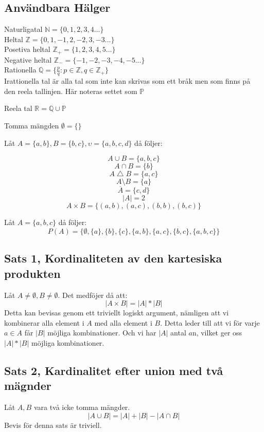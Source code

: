 \documentclass{article}
\begin{document}
	\subsection{Användbara Hälger}
	Naturligatal $\mathbb{N} = \{0, 1, 2, 3, 4...\}$\\
	Heltal $\mathbb{Z} = \{0, 1, -1, 2, -2, 3, -3...\}$\\
	Posetiva heltal $\mathbb{Z}_{+} = \{1, 2, 3, 4, 5...\}$\\
	Negative heltal $\mathbb{Z}_{-} = \{-1, -2, -3, -4, -5...\}$\\
	Rationella $\mathbb{Q} = \{\frac{p}{q} : p \in \mathbb{Z}, q \in \mathbb{Z}_{+}\}$\\

	Irattionella tal är alla tal som inte kan skrivas som ett bråk men som finns på den reela tallinjen. Här noteras settet som $\mathbb{P}$

	Reela tal \( \mathbb{R} = \mathbb{Q} \cup \mathbb{P} \)

	Tomma mängden $\emptyset = \{\}$

	Låt $A = \{a, b\}, B = \{b, c\}, \upsilon = \{a, b, c, d\}$ då följer:

	$$ A \cup B = \{a, b, c\} $$
	$$ A \cap B = \{b\} $$
	$$ A \bigtriangleup B = \{a, c\} $$
	$$ A \setminus B = \{a\} $$
	$$ \overline{A} = \{c, d\} $$
	$$ |A| = 2 $$
	$$ A \times B = \{(a, b), (a, c), (b, b), (b, c)\}$$

	Låt $A = \{a, b, c\}$ då följer: 
	$$ P(A) = \{\emptyset, \{a\}, \{b\}, \{c\}, \{a, b\}, \{a, c\}, \{b, c\}, \{a, b, c\}\} $$

	\subsection{Sats 1, Kordinaliteten av den kartesiska produkten}
	Låt $A \not= \emptyset, B \not= \emptyset$. Det medföjer då att:
	$$ |A \times B| = |A| * |B| $$ 
	Detta kan bevisas genom ett triviellt logiskt argument, nämligen att vi kombinerar alla element i $A$ med alla element i $B$. 
	Detta leder till att vi för varje $a \in A$ får $|B|$ möjliga kombinationer. Och vi har $|A|$ antal $a$n, vilket ger oss $ |A| * |B| $ möjliga kombinationer. 
	
	\subsection{Sats 2, Kardinalitet efter union med två mägnder}
	Låt $A, B$ vara två icke tomma mängder.
	$$ |A \cup B| = |A| + |B| - |A \cap B| $$
	Bevis för denna sats är triviell.
	
\end{document}
